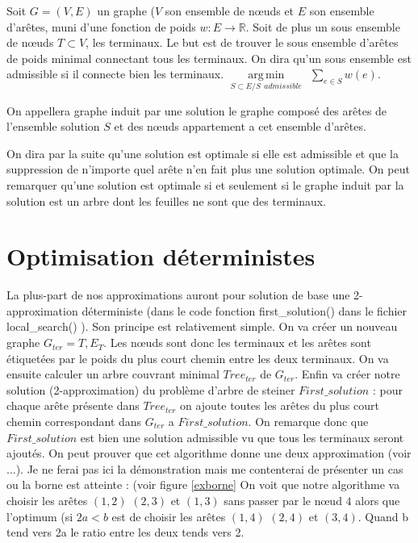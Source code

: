 \documentclass[10pt,a4paper]{article}
\DeclareMathOperator*{\argmin}{arg\,min}
\begin{document}
Soit $G = (V,E)$ un graphe ($V$ son ensemble de nœuds et $E$ son ensemble d'arêtes, muni d'une fonction de poids $w:E\rightarrow \mathbb{R}$. Soit de plus un sous ensemble de nœuds $T \subset V$, les terminaux. Le but est de trouver le sous ensemble d'arêtes de poids minimal connectant tous les terminaux. On dira qu'un sous ensemble est admissible si il connecte bien les terminaux.  $\argmin\limits_{S\subset E / S ~~admissible} ~~ \sum\limits_{e\in S} w(e) $. 

On appellera graphe induit par une solution le graphe composé des arêtes de l'ensemble solution $S$ et des nœuds appartement a cet ensemble d'arêtes. 

On dira par la suite qu'une solution est optimale si elle est admissible et que la suppression de n'importe quel arête n'en fait plus une solution optimale. On peut remarquer qu'une solution est optimale si et seulement si le graphe induit par la solution est un arbre dont les feuilles ne sont que des terminaux. 

\section{Optimisation déterministes}

La plus-part de nos approximations auront pour solution de base une 2-approximation déterministe (dans le code fonction first\_solution() dans le fichier local\_search() ).
Son principe est relativement simple. On va créer un nouveau graphe $G_{ter} = {T, E_T}$. Les nœuds sont donc les terminaux et les arêtes sont étiquetées par le poids du plus court chemin entre les deux terminaux. On va ensuite calculer un arbre couvrant minimal $Tree_{ter}$ de $G_{ter}$. Enfin va créer notre solution (2-approximation) du problème d'arbre de steiner $First\_solution$ :  pour chaque arête présente dans $Tree_{ter}$ on ajoute toutes les arêtes du plus court chemin correspondant dans $G_{ter} $ a $First\_solution$. On remarque donc que $First\_solution$ est bien une solution admissible vu que tous les terminaux seront ajoutés. On peut prouver que cet algorithme donne une deux approximation (voir ...). Je ne ferai pas ici la démonstration mais me contenterai de présenter un cas ou la borne est atteinte : (voir figure \ref{exborne} On voit que notre algorithme va choisir les arêtes $(1,2)$ $(2,3)$ et $(1,3)$ sans passer par le nœud $4$ alors que l'optimum (si $2a<b$ est de choisir les arêtes $(1,4)$ $(2,4)$ et $(3,4)$. Quand b tend vers 2a le ratio entre les deux tends vers 2.
\end{document}
